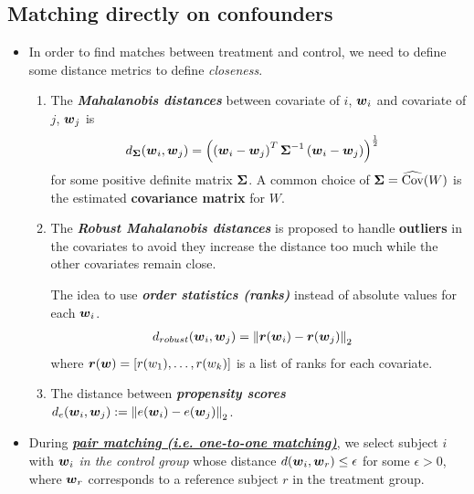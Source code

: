 \documentclass[11pt]{article}
\begin{document}
\subsection{Matching directly on confounders}
\begin{itemize}
\item In order to find matches between treatment and control, we need to define some distance metrics to define \emph{closeness}. 
\begin{enumerate}
\item The \emph{\textbf{Mahalanobis distances}} between covariate of $i$, $\boldsymbol{w}_i$ and covariate of $j$, $\boldsymbol{w}_j$ is
\begin{align*}
d_{\boldsymbol{\Sigma}}(\boldsymbol{w}_i, \boldsymbol{w}_j) &= \left(\left(\boldsymbol{w}_i-\boldsymbol{w}_j\right)^{T}\boldsymbol{\Sigma}^{-1}\left(\boldsymbol{w}_i-\boldsymbol{w}_j\right)\right)^{\frac{1}{2}}
\end{align*} for some positive definite matrix $\boldsymbol{\Sigma}$. A common choice of $\boldsymbol{\Sigma} = \widehat{\text{Cov}}(W)$ is the estimated \textbf{covariance matrix} for $W$.

\item The \emph{\textbf{Robust Mahalanobis distances}} \citep{rosenbaum2017observation} is proposed to handle \textbf{outliers} in the covariates to avoid they increase the distance too much while the other covariates remain close. 

The idea to use \emph{\textbf{order statistics (ranks)}} instead of absolute values for each $\boldsymbol{w}_{i}$.
\begin{align*}
d_{robust}(\boldsymbol{w}_i, \boldsymbol{w}_j) &= \left\|\boldsymbol{r}(\boldsymbol{w}_{i}) -  \boldsymbol{r}(\boldsymbol{w}_{j})\right\|_{2}
\end{align*} where $\boldsymbol{r}(\boldsymbol{w}) = [r(w_1), \ldots, r(w_{k})]$ is a list of ranks for each covariate.

\item The distance between \emph{\textbf{propensity scores}} $d_{e}(\boldsymbol{w}_i, \boldsymbol{w}_j) := \left\|e(\boldsymbol{w}_i) - e(\boldsymbol{w}_j)\right\|_{2}$.
\end{enumerate}

\item During \underline{\emph{\textbf{pair matching (i.e. one-to-one matching)}}}, we select subject $i$ with $\boldsymbol{w}_{i}$ \emph{in the control group} whose distance $d(\boldsymbol{w}_i, \boldsymbol{w}_r) \le \epsilon$ for some $\epsilon >0$, where $\boldsymbol{w}_r$ corresponds to a reference subject $r$ in the treatment group. 
\end{itemize}
\end{document}
